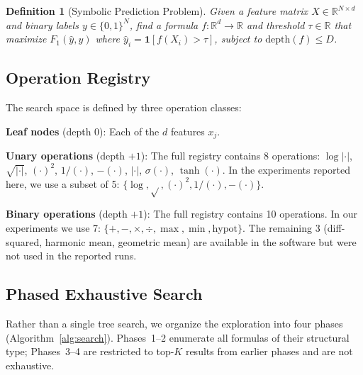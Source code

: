 \documentclass[journal]{IEEEtran}
\newtheorem{definition}{Definition}
\begin{document}
\begin{definition}[Symbolic Prediction Problem]
Given a feature matrix $X \in \mathbb{R}^{N \times d}$ and binary
labels $y \in \{0, 1\}^N$, find a formula
$f: \mathbb{R}^d \to \mathbb{R}$ and threshold $\tau \in \mathbb{R}$
that maximize $F_1(\hat{y}, y)$ where
$\hat{y}_i = \mathbf{1}[f(X_i) > \tau]$, subject to
$\mathrm{depth}(f) \leq D$.
\end{definition}

\subsection{Operation Registry}

The search space is defined by three operation classes:

\textbf{Leaf nodes} (depth 0): Each of the $d$ features $x_j$.

\textbf{Unary operations} (depth $+1$): The full registry contains 8
operations: $\log|\cdot|$, $\sqrt{|\cdot|}$, $(\cdot)^2$, $1/(\cdot)$,
$-(\cdot)$, $|\cdot|$, $\sigma(\cdot)$, $\tanh(\cdot)$.
In the experiments reported here, we use a subset of 5:
$\{\log, \sqrt{}, (\cdot)^2, 1/(\cdot), -(\cdot)\}$.

\textbf{Binary operations} (depth $+1$): The full registry contains 10
operations. In our experiments we use 7:
$\{+, -, \times, \div, \max, \min, \mathrm{hypot}\}$.
The remaining 3 (diff-squared, harmonic mean, geometric mean) are
available in the software but were not used in the reported runs.

\subsection{Phased Exhaustive Search}

Rather than a single tree search, we organize the exploration into
four phases (Algorithm~\ref{alg:search}). Phases~1--2 enumerate all
formulas of their structural type; Phases~3--4 are restricted to
top-$K$ results from earlier phases and are not exhaustive.
\end{document}

